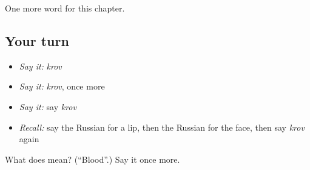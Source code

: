 \begin{grammarlens}[title={What you've built}]
One more word for this chapter.
\end{grammarlens}

\subsection*{Your turn}
\begin{itemize}
\raggedright
  \item \emph{Say it:} \emph{krov}
  \item \emph{Say it:} \emph{krov}, once more
  \item \emph{Say it:} say \emph{krov}
  \item \emph{Recall:} say the Russian for a lip, then the Russian for the face, then say \emph{krov} again
\end{itemize}

\begin{tcolorbox}[breakable,colback=teal!4,colframe=teal!35!black,title={Before you move on}]
What does  mean? (\textquotedblleft{}Blood\textquotedblright{}.) Say it once more.
\end{tcolorbox}
